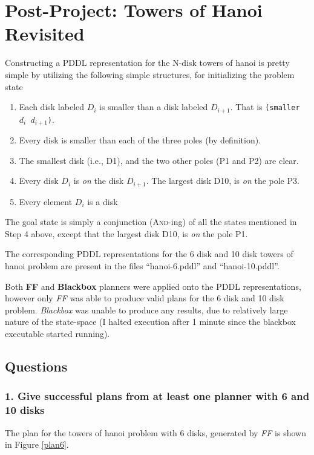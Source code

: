\documentclass[10pt, letter]{article}
\begin{document}
\section{Post-Project: Towers of Hanoi Revisited}
Constructing a PDDL representation for the N-disk towers of hanoi is pretty simple by utilizing the following simple structures, for initializing the problem state
\begin{enumerate}
\item Each disk labeled $D_i$ is smaller than a disk labeled $D_{i+1}$. That is \texttt{(smaller $d_i$ $d_{i+1}$)}.
\item Every disk is smaller than each of the three poles (by definition).
\item The smallest disk (i.e., D1), and the two other poles (P1 and P2) are clear.
\item Every disk $D_i$ is \emph{on} the disk $D_{i+1}$. The largest disk D10, is \emph{on} the pole P3.
\item Every element $D_i$ is a disk
\end{enumerate}
The goal state is simply a conjunction (\textsc{And}-ing) of all the states mentioned in Step 4 above, except that the largest disk D10, is \emph{on} the pole P1.

The corresponding PDDL representations for the 6 disk and 10 disk towers of hanoi problem are present in the files ``hanoi-6.pddl'' and ``hanoi-10.pddl''.

Both \textbf{FF} and \textbf{Blackbox} planners were applied onto the PDDL representations, however only \textit{FF} was able to produce valid plans for the 6 disk and 10 disk problem. \textit{Blackbox} was unable to produce any results, due to relatively large nature of the state-space (I halted execution after 1 minute since the blackbox executable started running).

\subsection{Questions}
\subsubsection*{1. Give successful plans from at least one planner with 6 and 10 disks}
The plan for the towers of hanoi problem with 6 disks, generated by \textit{FF} is shown in Figure \ref{plan6}.
\end{document}
